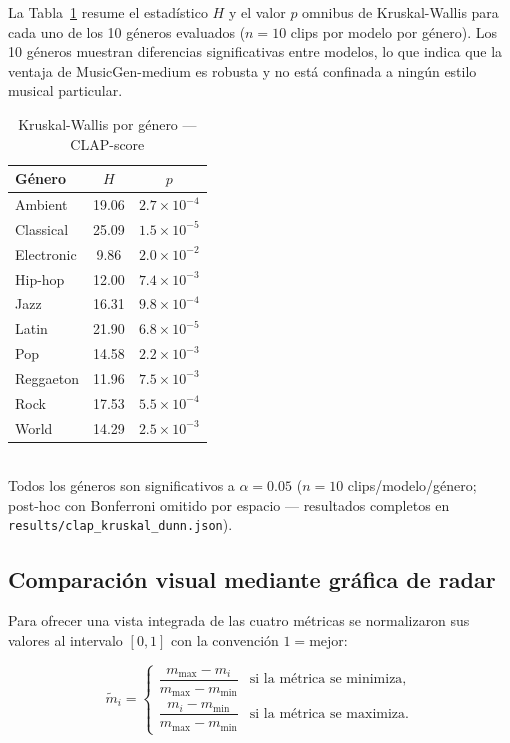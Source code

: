 La Tabla~\ref{tab:kruskal_genre} resume el estadístico $H$ y el valor $p$
omnibus de Kruskal-Wallis para cada uno de los 10 géneros evaluados
($n = 10$ clips por modelo por género).
Los 10 géneros muestran diferencias significativas entre modelos, lo que
indica que la ventaja de MusicGen-medium es robusta y no está confinada a
ningún estilo musical particular.

\begin{table}[t]
  \caption{Kruskal-Wallis por género — CLAP-score}
  \label{tab:kruskal_genre}
  \centering
  \begin{tabular}{lcc}
    \hline
    \textbf{Género} & \textbf{$H$} & \textbf{$p$} \\
    \hline
    Ambient     & 19.06 & $2.7\times10^{-4}$ \\
    Classical   & 25.09 & $1.5\times10^{-5}$ \\
    Electronic  & 9.86 & $2.0\times10^{-2}$ \\
    Hip-hop     & 12.00 & $7.4\times10^{-3}$ \\
    Jazz        & 16.31 & $9.8\times10^{-4}$ \\
    Latin       & 21.90 & $6.8\times10^{-5}$ \\
    Pop         & 14.58 & $2.2\times10^{-3}$ \\
    Reggaeton   & 11.96 & $7.5\times10^{-3}$ \\
    Rock        & 17.53 & $5.5\times10^{-4}$ \\
    World       & 14.29 & $2.5\times10^{-3}$ \\
    \hline
  \end{tabular}
  \smallskip\\
  \footnotesize{Todos los géneros son significativos a $\alpha=0.05$
  ($n=10$ clips/modelo/género; post-hoc con Bonferroni omitido
  por espacio — resultados completos en \texttt{results/clap\_kruskal\_dunn.json}).}
\end{table}

\subsection{Comparación visual mediante gráfica de radar}
\label{sec:benchmark:radar}

Para ofrecer una vista integrada de las cuatro métricas se normalizaron sus
valores al intervalo $[0, 1]$ con la convención $1 = \text{mejor}$:

\begin{equation}
  \tilde{m}_{i} =
  \begin{cases}
    \dfrac{m_{\max} - m_{i}}{m_{\max} - m_{\min}} & \text{si la métrica se minimiza,} \\[6pt]
    \dfrac{m_{i} - m_{\min}}{m_{\max} - m_{\min}} & \text{si la métrica se maximiza.}
  \end{cases}
  \label{eq:normalize}
\end{equation}

